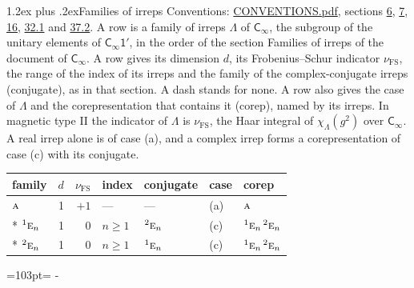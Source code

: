 \documentclass[10pt,a4paper]{article}
\makeatletter
\renewcommand\section{\@startsection{section}{1}{\z@}{-3ex plus -1ex minus -.2ex}%
  {1.2ex plus .2ex}{\normalfont\large\sffamily\bfseries\color{parttitle}}}
\newcommand{\needspace}[1]{\par\penalty-100\begingroup\dimen0=#1\relax\dimen2=\pagegoal
  \advance\dimen2-\pagetotal\ifdim\dimen0>\dimen2\relax\ifdim\dimen2>0pt\vfil\break\fi\fi
  \endgroup}
\numberwithin{equation}{section}
\newcommand{\grp}[1]{\mathsf{#1}}
\newcommand{\irr}[1]{\text{\normalfont\scshape #1}}
\newcommand{\conjpair}[1]{{}^{#1}}
\newcommand{\irchar}[1]{\chi_{#1}}
\newcommand{\fsind}{\nu_{\mathrm{FS}}}
\makeatother
\begin{document}
\section{Families of irreps}\label{s:families}
Conventions: \href{../../CONVENTIONS.pdf}{CONVENTIONS.pdf}, sections \href{../../../rotation/CONVENTIONS.pdf\#conv.6}{6}, \href{../../../rotation/CONVENTIONS.pdf\#conv.7}{7}, \href{../../../rotation/CONVENTIONS.pdf\#conv.16}{16}, \href{../../CONVENTIONS.pdf\#conv.32.1}{32.1} and \href{../../CONVENTIONS.pdf\#conv.37.2}{37.2}.
\leavevmode\label{n:irrep.Delta}\label{n:head.family.irreps}A row is a family of irreps $\Lambda$ of $\grp{C_{\infty}}$, the subgroup of the unitary elements of $\grp{C_{\infty}1'}$, in the order of the section Families of irreps of the document of \href{../../../rotation/data/pdf/Cinf.pdf}{$\grp{C_{\infty}}$}. \label{n:index.dimension}\label{n:index.frobenius}\label{n:head.index.family}\label{n:index.family}\label{n:head.conjugate}A row gives its dimension $d$, its Frobenius--Schur indicator $\fsind$, the range of the index of its irreps and the family of the complex-conjugate irreps (conjugate), as in that section. A dash stands for none. \label{n:head.case.corep}\label{n:head.corep}\label{n:function.character}A row also gives the case of $\Lambda$ and the corepresentation that contains it (corep), named by its irreps. In magnetic type II the indicator of $\Lambda$ is $\fsind$, the Haar integral of $\irchar{\Lambda}(g^2)$ over $\grp{C_{\infty}}$. A real irrep alone is of case (a), and a complex irrep forms a corepresentation of case (c) with its conjugate.
{\small\renewcommand{\arraystretch}{1.25}\begin{longtable}{@{}lrrllll@{}}\toprule
family & $d$ & $\fsind$ & index & conjugate & case & corep\\\midrule\endhead
\bottomrule\endfoot\endlastfoot
$\irr{a}$ & 1 & $+1$ & --- & --- & (a) & $\irr{a}$\\*
$\conjpair{1}\irr{e}_{n}$ & 1 & $0$ & $n \ge 1$ & $\conjpair{2}\irr{e}_{n}$ & (c) & $\conjpair{1}\irr{e}_{n}\,\conjpair{2}\irr{e}_{n}$\\*
$\conjpair{2}\irr{e}_{n}$ & 1 & $0$ & $n \ge 1$ & $\conjpair{1}\irr{e}_{n}$ & (c) & $\conjpair{1}\irr{e}_{n}\,\conjpair{2}\irr{e}_{n}$\\
\bottomrule\end{longtable}}
\needspace{103pt}
\end{document}
